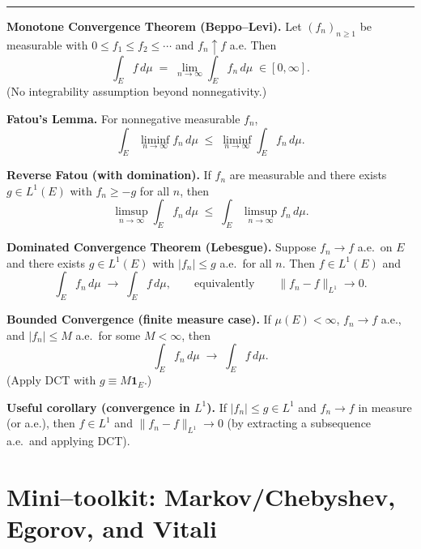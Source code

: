 \documentclass[12pt,a4paper]{article}
\theoremstyle{plain}
\theoremstyle{definition}
\theoremstyle{remark}
\theoremstyle{remark}
\newcommand{\tighthrule}{\vspace{0.6\baselineskip}\hrule\vspace{0.8\baselineskip}}
\newenvironment{spacy}{\begingroup\setlength{\parskip}{6pt}\setlength{\parindent}{0pt}}{\endgroup}
\theoremstyle{definition}
\begin{document}
\tighthrule
\begin{spacy}
	\textbf{Monotone Convergence Theorem (Beppo--Levi).}
	Let $(f_n)_{n\ge1}$ be measurable with $0\le f_1\le f_2\le\cdots$ and $f_n\uparrow f$ a.e.
	Then
	\[
	\int_E f\,d\mu \;=\; \lim_{n\to\infty}\int_E f_n\,d\mu \;\in [0,\infty].
	\]
	(No integrability assumption beyond nonnegativity.)
	
	\medskip
	
	\textbf{Fatou's Lemma.}
	For nonnegative measurable $f_n$,
	\[
	\int_E \liminf_{n\to\infty} f_n \, d\mu
	\;\le\;
	\liminf_{n\to\infty} \int_E f_n \, d\mu .
	\]
	
	\medskip
	
	\textbf{Reverse Fatou (with domination).}
	If $f_n$ are measurable and there exists $g\in L^1(E)$ with $f_n\ge -g$ for all $n$, then
	\[
	\limsup_{n\to\infty} \int_E f_n \, d\mu
	\;\le\;
	\int_E \limsup_{n\to\infty} f_n \, d\mu .
	\]
	
	\medskip
	
	\textbf{Dominated Convergence Theorem (Lebesgue).}
	Suppose $f_n \to f$ a.e.\ on $E$ and there exists $g\in L^1(E)$ with $|f_n|\le g$ a.e.\ for all $n$.
	Then $f\in L^1(E)$ and
	\[
	\int_E f_n \, d\mu \;\to\; \int_E f \, d\mu,
	\qquad\text{equivalently}\qquad
	\|f_n-f\|_{L^1}\to 0.
	\]
	
	\medskip
	
	\textbf{Bounded Convergence (finite measure case).}
	If $\mu(E)<\infty$, $f_n\to f$ a.e., and $|f_n|\le M$ a.e.\ for some $M<\infty$, then
	\[
	\int_E f_n \, d\mu \;\to\; \int_E f \, d\mu .
	\]
	(Apply DCT with $g\equiv M\mathbf 1_E$.)
	
	\medskip
	
	\textbf{Useful corollary (convergence in $L^1$).}
	If $|f_n|\le g\in L^1$ and $f_n\to f$ in measure (or a.e.), then $f\in L^1$ and
	$\|f_n-f\|_{L^1}\to 0$ (by extracting a subsequence a.e.\ and applying DCT).
\end{spacy}

\section*{Mini–toolkit: Markov/Chebyshev, Egorov, and Vitali}
\end{document}
